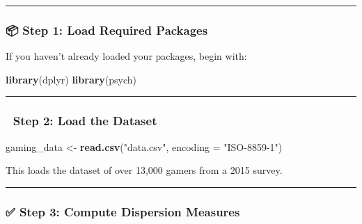 \documentclass[
]{book}
\newenvironment{Shaded}{\begin{snugshade}}{\end{snugshade}}
\newcommand{\AttributeTok}[1]{\textcolor[rgb]{0.13,0.29,0.53}{#1}}
\newcommand{\FunctionTok}[1]{\textcolor[rgb]{0.13,0.29,0.53}{\textbf{#1}}}
\newcommand{\NormalTok}[1]{#1}
\newcommand{\OtherTok}[1]{\textcolor[rgb]{0.56,0.35,0.01}{#1}}
\newcommand{\StringTok}[1]{\textcolor[rgb]{0.31,0.60,0.02}{#1}}
\begin{document}
\begin{center}\rule{0.5\linewidth}{0.5pt}\end{center}

\subsubsection*{📦 Step 1: Load Required Packages}\label{step-1-load-required-packages}

If you haven't already loaded your packages, begin with:

\begin{Shaded}
\begin{Highlighting}[]
\FunctionTok{library}\NormalTok{(dplyr)}
\FunctionTok{library}\NormalTok{(psych)}
\end{Highlighting}
\end{Shaded}

\begin{center}\rule{0.5\linewidth}{0.5pt}\end{center}

\subsubsection*{📂 Step 2: Load the Dataset}\label{step-2-load-the-dataset}

\begin{Shaded}
\begin{Highlighting}[]
\NormalTok{gaming\_data }\OtherTok{\textless{}{-}} \FunctionTok{read.csv}\NormalTok{(}\StringTok{"data.csv"}\NormalTok{, }\AttributeTok{encoding =} \StringTok{"ISO{-}8859{-}1"}\NormalTok{)}
\end{Highlighting}
\end{Shaded}

This loads the dataset of over 13,000 gamers from a 2015 survey.

\begin{center}\rule{0.5\linewidth}{0.5pt}\end{center}

\subsubsection*{✅ Step 3: Compute Dispersion Measures}\label{step-3-compute-dispersion-measures}
\end{document}
